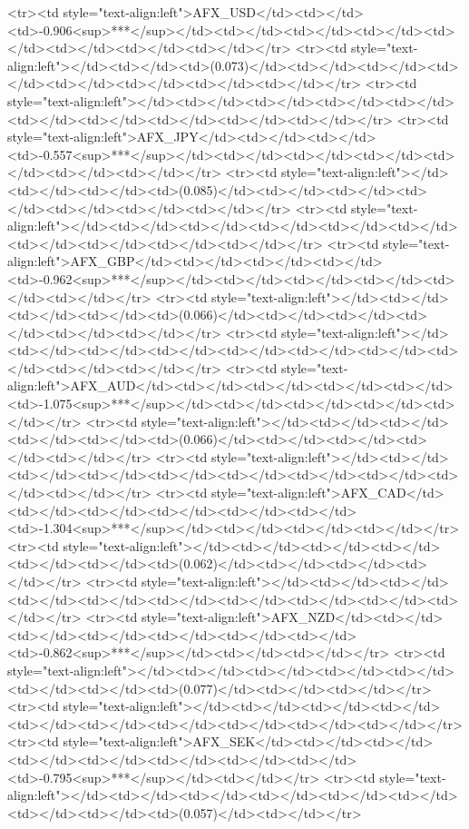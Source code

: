 <tr><td style="text-align:left">AFX_USD</td><td></td><td>-0.906<sup>***</sup></td><td></td><td></td><td></td><td></td><td></td><td></td><td></td></tr>
<tr><td style="text-align:left"></td><td></td><td>(0.073)</td><td></td><td></td><td></td><td></td><td></td><td></td><td></td></tr>
<tr><td style="text-align:left"></td><td></td><td></td><td></td><td></td><td></td><td></td><td></td><td></td><td></td></tr>
<tr><td style="text-align:left">AFX_JPY</td><td></td><td></td><td>-0.557<sup>***</sup></td><td></td><td></td><td></td><td></td><td></td><td></td></tr>
<tr><td style="text-align:left"></td><td></td><td></td><td>(0.085)</td><td></td><td></td><td></td><td></td><td></td><td></td></tr>
<tr><td style="text-align:left"></td><td></td><td></td><td></td><td></td><td></td><td></td><td></td><td></td><td></td></tr>
<tr><td style="text-align:left">AFX_GBP</td><td></td><td></td><td></td><td>-0.962<sup>***</sup></td><td></td><td></td><td></td><td></td><td></td></tr>
<tr><td style="text-align:left"></td><td></td><td></td><td></td><td>(0.066)</td><td></td><td></td><td></td><td></td><td></td></tr>
<tr><td style="text-align:left"></td><td></td><td></td><td></td><td></td><td></td><td></td><td></td><td></td><td></td></tr>
<tr><td style="text-align:left">AFX_AUD</td><td></td><td></td><td></td><td></td><td>-1.075<sup>***</sup></td><td></td><td></td><td></td><td></td></tr>
<tr><td style="text-align:left"></td><td></td><td></td><td></td><td></td><td>(0.066)</td><td></td><td></td><td></td><td></td></tr>
<tr><td style="text-align:left"></td><td></td><td></td><td></td><td></td><td></td><td></td><td></td><td></td><td></td></tr>
<tr><td style="text-align:left">AFX_CAD</td><td></td><td></td><td></td><td></td><td></td><td>-1.304<sup>***</sup></td><td></td><td></td><td></td></tr>
<tr><td style="text-align:left"></td><td></td><td></td><td></td><td></td><td></td><td>(0.062)</td><td></td><td></td><td></td></tr>
<tr><td style="text-align:left"></td><td></td><td></td><td></td><td></td><td></td><td></td><td></td><td></td><td></td></tr>
<tr><td style="text-align:left">AFX_NZD</td><td></td><td></td><td></td><td></td><td></td><td></td><td>-0.862<sup>***</sup></td><td></td><td></td></tr>
<tr><td style="text-align:left"></td><td></td><td></td><td></td><td></td><td></td><td></td><td>(0.077)</td><td></td><td></td></tr>
<tr><td style="text-align:left"></td><td></td><td></td><td></td><td></td><td></td><td></td><td></td><td></td><td></td></tr>
<tr><td style="text-align:left">AFX_SEK</td><td></td><td></td><td></td><td></td><td></td><td></td><td></td><td>-0.795<sup>***</sup></td><td></td></tr>
<tr><td style="text-align:left"></td><td></td><td></td><td></td><td></td><td></td><td></td><td></td><td>(0.057)</td><td></td></tr>
